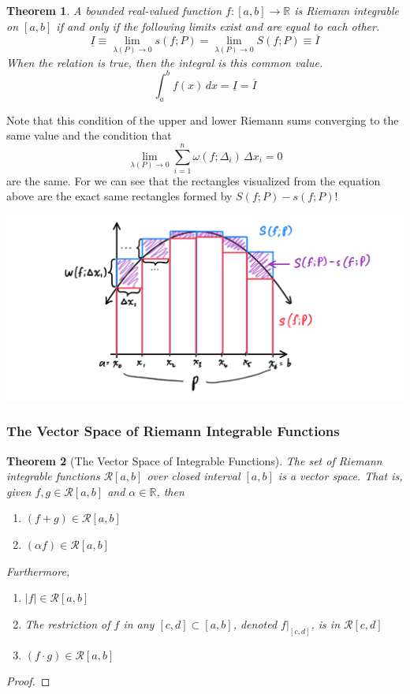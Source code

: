 \documentclass{article}
\newtheorem{theorem}{Theorem}[section]
\theoremstyle{remark}
\theoremstyle{definition}
\begin{document}
\begin{theorem}
A bounded real-valued function $f: [a, b] \longrightarrow \mathbb{R}$ is Riemann integrable on $[a, b]$ if and only if the following limits exist and are equal to each other. 
\[\underline{I} \equiv \lim_{\lambda(P) \rightarrow 0} s(f; P) = \lim_{\lambda(P) \rightarrow 0} S(f; P) \equiv \overline{I}\]
When the relation is true, then the integral is this common value. 
\[\int_a^b f(x) \,dx = \underline{I} = \overline{I}\]
\end{theorem}

Note that this condition of the upper and lower Riemann sums converging to the same value and the condition that 
\[\lim_{\lambda(P) \rightarrow 0} \sum_{i = 1}^n \omega (f; \Delta_i) \, \Delta x_i = 0\]
are the same. For we can see that the rectangles visualized from the equation above are the exact same rectangles formed by $S(f; P) - s(f; P)$! 
\begin{center}
    \includegraphics[scale=0.3]{img/Equivalent_Conditions_for_Integrability.PNG}
\end{center}

\subsubsection{The Vector Space of Riemann Integrable Functions}

\begin{theorem}[The Vector Space of Integrable Functions]
The set of Riemann integrable functions $\mathcal{R}[a, b]$ over closed interval $[a, b]$ is a vector space. That is, given $f, g \in \mathcal{R}[a, b]$ and $\alpha \in \mathbb{R}$, then
\begin{enumerate}
    \item $(f + g) \in \mathcal{R}[a, b]$ 
    \item $(\alpha f) \in \mathcal{R}[a, b]$
\end{enumerate}
Furthermore, 
\begin{enumerate}
    \item $|f| \in \mathcal{R}[a, b]$
    \item The restriction of $f$ in any $[c, d] \subset [a, b]$, denoted $f \big|_{[c,d]}$, is in $\mathcal{R}[c,d]$
    \item $(f \cdot g) \in \mathcal{R}[a, b]$
\end{enumerate}
\end{theorem}
\begin{proof}

\end{proof}
\end{document}
